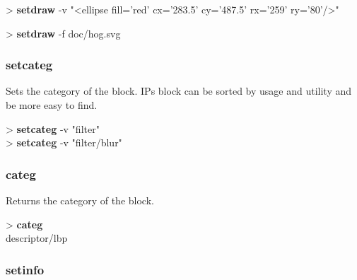 \documentclass[10pt,a4paper]{article}
\begin{document}

\begin{sampletitle}[1]
> \textbf{\tool{} setdraw} -v "<ellipse fill='red' cx='283.5' cy='487.5' rx='259' ry='80'/>"
\end{sampletitle}

\begin{sampletitle}[2]
> \textbf{\tool{} setdraw} -f doc/hog.svg
\end{sampletitle}

\subsubsection{setcateg}

Sets the category of the block. IPs block can be sorted by usage and utility and be more easy to find. \\


\begin{sampletitle}
> \textbf{\tool{} setcateg}  -v "filter"\\
> \textbf{\tool{} setcateg}  -v "filter/blur"
\end{sampletitle}

\subsubsection{categ}

Returns the category of the block.

\begin{sampletitle}
> \textbf{\tool{} categ}\\descriptor/lbp
\end{sampletitle}

\subsubsection{setinfo}
\end{document}
